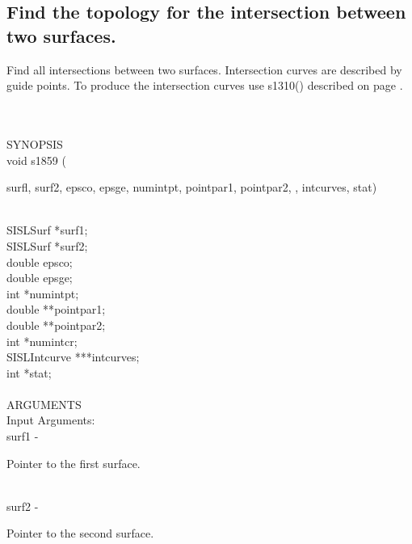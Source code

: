 \subsection{Find the topology for the intersection between two surfaces.}
\begin{minipg1}
  Find all intersections between two surfaces.
  Intersection curves are described by guide points.
  To produce the intersection curves use s1310() described on page \pageref{s1310}.
\end{minipg1} \\ \\
SYNOPSIS\\
        \>void s1859    (\begin{minipg3}
                {\fov surfl}, {\fov surf2}, {\fov epsco}, {\fov epsge}, {\fov numintpt},
                {\fov pointpar1}, {\fov pointpar2}, , {\fov intcurves},
                {\fov stat})
                \end{minipg3}\\[0.3ex]
                \>\>    SISLSurf        \>      *{\fov surf1};\\
                \>\>    SISLSurf        \>      *{\fov surf2};\\
                \>\>    double  \>      {\fov epsco};\\
                \>\>    double  \>      {\fov epsge};\\
                \>\>    int     \>      *{\fov numintpt};\\
                \>\>    double  \>      **{\fov pointpar1};\\
                \>\>    double  \>      **{\fov pointpar2};\\
                \>\>    int     \>      *{\fov numintcr};\\
                \>\>    SISLIntcurve\>  ***{\fov intcurves};\\
                \>\>    int     \>      *{\fov stat};\\
\\
ARGUMENTS\\
        \>Input Arguments:\\
        \>\>    {\fov surf1}\> - \>     \begin{minipg2}
                                Pointer to the first surface.
                                \end{minipg2}\\
        \>\>    {\fov surf2}\> - \>     \begin{minipg2}
                                Pointer to the second surface.
                                \end{minipg2}\\
